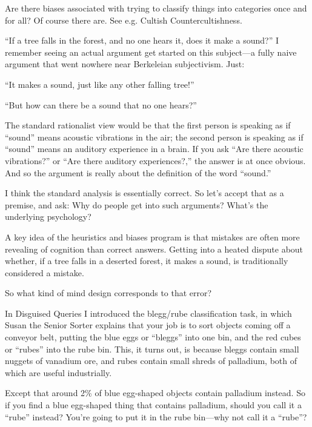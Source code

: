 {
 Are there biases associated with trying to classify things into
categories once and for all? Of course there are. See e.g. Cultish
Countercultishness.}

\myendsectiontext


{
 ``If a tree falls in the forest, and no one hears
it, does it make a sound?'' I remember seeing an
actual argument get started on this subject---a fully naive argument
that went nowhere near Berkeleian subjectivism. Just:}

{
 ``It makes a sound, just like any other falling
tree!''}

{
 ``But how can there be a sound that no one
hears?''}

{
 The standard rationalist view would be that the first person is
speaking as if ``sound'' means
acoustic vibrations in the air; the second person is speaking as if
``sound'' means an auditory
experience in a brain. If you ask ``Are there acoustic
vibrations?'' or ``Are there
auditory experiences?,'' the answer is at once
obvious. And so the argument is really about the definition of the word
``sound.''}

{
 I think the standard analysis is essentially correct. So
let's accept that as a premise, and ask: Why do people
get into such arguments? What's the underlying
psychology?}

{
 A key idea of the heuristics and biases program is that mistakes
are often more revealing of cognition than correct answers. Getting
into a heated dispute about whether, if a tree falls in a deserted
forest, it makes a sound, is traditionally considered a mistake.}

{
 So what kind of mind design corresponds to that error?}

{
 In Disguised Queries I introduced the blegg/rube classification
task, in which Susan the Senior Sorter explains that your job is to
sort objects coming off a conveyor belt, putting the blue eggs or
``bleggs'' into one bin, and the red
cubes or ``rubes'' into the rube
bin. This, it turns out, is because bleggs contain small nuggets of
vanadium ore, and rubes contain small shreds of palladium, both of
which are useful industrially.}

{
 Except that around 2\% of blue egg-shaped objects contain
palladium instead. So if you find a blue egg-shaped thing that contains
palladium, should you call it a
``rube'' instead?
You're going to put it in the rube bin---why not call
it a ``rube''?}

